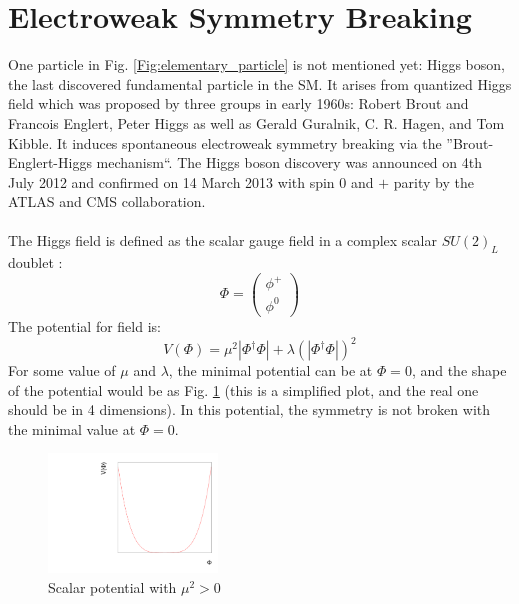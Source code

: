 \section{Electroweak Symmetry Breaking}
One particle in Fig. \ref{Fig:elementary_particle} is not mentioned yet: Higgs boson, the last discovered fundamental particle in the SM. It 
arises from quantized Higgs field which was proposed by three groups in early 1960s:  Robert Brout and Francois Englert, Peter Higgs as well as Gerald Guralnik, C. R. Hagen, and Tom Kibble. It induces spontaneous electroweak symmetry breaking via the ''Brout-Englert-Higgs mechanism``.  The Higgs boson discovery was announced on 4th July 2012 and confirmed on 14 March 2013 with spin 0 and $+$ parity by the ATLAS and CMS collaboration.
\\
\\The Higgs field is defined as the scalar gauge field in a complex scalar $SU(2)_L$ doublet :
\begin{equation}
 \Phi= \left(  \begin{array}{ c } \phi^+\\  \phi^0 \end{array} \right) 
\end{equation}
The potential for field is:
\begin{equation}
 V(\Phi)=\mu^2|\Phi^\dagger\Phi|+\lambda(|\Phi^\dagger\Phi|)^2
\label{Eq:sm_higgs_potential}
\end{equation}
For some value of $\mu$ and $\lambda$, the minimal potential can be at $\Phi = 0$, and the shape of the potential would be as Fig. \ref{Fig:V} (this is a simplified plot, and the real one should be in 4 dimensions). In this potential, the symmetry is not broken with the minimal value at $\Phi = 0$.
\\ 
\begin{figure}[!h]                
	\includegraphics[width=0.4\textwidth]{Chapter1/V.pdf}
	\centering
	\begin{center}
		\caption{Scalar potential with $\mu^2 > 0$}
		\label{Fig:V}            
	\end{center}
\end{figure}
